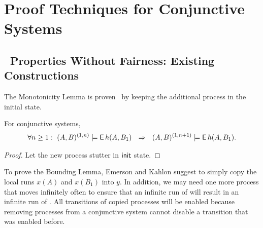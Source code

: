 \section{Proof Techniques for Conjunctive Systems} \label{gua:sec:proofs-conj}

\subsection{\LTLmX\ Properties Without Fairness: Existing Constructions} \label{gua:sec:ideas-conj-nofair}

The Monotonicity Lemma is proven~\cite{Emerson00} by keeping the additional process in the initial state.

\begin{lemma} \label{le:ConjMonotonicityLemma}
For conjunctive systems,
\begin{align*}
\forall n \geq 1:\ 
(A,B)^{(1,n)} \models \pexists h(A,B_1)
\ \ \Impl \ \ 
(A,B)^{(1,n+1)}\models \pexists h(A,B_1).
\end{align*}
\end{lemma}
\begin{proof}
Let the new process stutter in ${\sf init}$ state.
\end{proof}

To prove the Bounding Lemma,
Emerson and Kahlon \cite{Emerson00} suggest
to simply copy the local runs $x(A)$ and $x(B_1)$ into $y$. 
In addition,
we may need one more process that moves infinitely often
to ensure that an infinite run of \largesys will result in an infinite run of \cutoffsys.
All transitions of copied processes will be enabled
because removing processes from a conjunctive system
cannot disable a transition that was enabled before.

